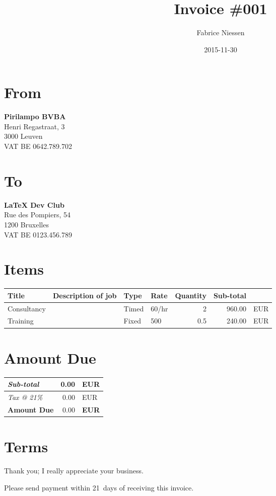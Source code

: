 \documentclass[11pt]{article}
\author{Fabrice Niessen}
\date{2015-11-30}
\title{Invoice \#001}
\begin{document}
\maketitle

\section*{From}
\label{sec:orgheadline1}

\textbf{Pirilampo BVBA} \\
Henri Regastraat, 3 \\
3000 Leuven \\
VAT BE 0642.789.702

\section*{To}
\label{sec:orgheadline2}

\textbf{\LaTeX{} Dev Club} \\
Rue des Pompiers, 54 \\
1200 Bruxelles \\
VAT BE 0123.456.789

\vspace*{1ex}{\color{prlp-gray2}\hrule}

\section*{Items}
\label{sec:orgheadline3}

\begin{center}
\label{tab:orgtable1}

\begin{tabular}{llllrrl}
Title & Description of job & Type & Rate & Quantity & Sub-total & \\
\hline
Consultancy &  & Timed & 60/hr & 2 & 960.00 & EUR\\
Training &  & Fixed & 500 & 0.5 & 240.00 & EUR\\
\end{tabular}
\end{center}

\section*{Amount Due}
\label{sec:orgheadline4}

\colorbox{prlp-light-gray}{\begin{minipage}{7.5cm}

\begin{center}
\begin{tabu}{Xrl}
\emph{Sub-total} & 0.00 & EUR\\
\hline
\emph{Tax @ 21\%} & 0.00 & EUR\\
\hline
\textbf{Amount Due} & 0.00 & \textbf{EUR}\\
\end{tabu}
\end{center}

\end{minipage}}

\section*{Terms}
\label{sec:orgheadline5}

Thank you; I really appreciate your business.

Please send payment within 21~days of receiving this invoice.
\end{document}
